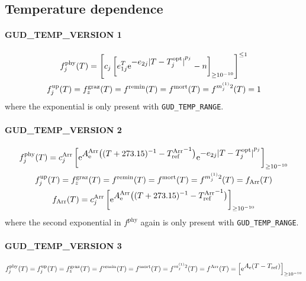 \documentclass[11pt,letterpaper,english]{article}
\let\ds=\displaystyle
\def\|#1|{\operatorname{#1}}
\def\mort{m^{(1)}_j}
\newcommand{\ee}{\mathrm{e}}
\newcommand{\graz}{{\text{graz}}}
\newcommand{\phy}{{\text{phy}}}
\newcommand{\up}{{\text{up}}}
\newcommand{\remin}{{\text{remin}}}
\begin{document}
\subsection{Temperature dependence}

\paragraph{GUD\_TEMP\_VERSION 1}
\begin{gather*}
  f^\phy_j(T) = \left[ c_j \left[ e_{1 j}^T
      \ee^{\ds -e_{2 j} {| T - T^{\|opt|}_j |}^{p_j}}  %
    - n \right]_{\ge\num{E-10}}
    \right]^{\le 1}
\\
  f^{\up}_j(T) =
  f^\graz_z(T) =
  f^\remin(T) =
  f^{\|mort|}(T) =
  f^{\mort2}(T) =
  1
\end{gather*}
where the exponential is only present with \verb|GUD_TEMP_RANGE|.

\paragraph{GUD\_TEMP\_VERSION 2}
\begin{gather*}
  f^\phy_j(T) = c^{\|Arr|}_j \left[
      \ee^{\ds A^{\|Arr|}_{\|e|}
           \bigl( (T+273.15)^{-1} - {T^{\|Arr|}_{\|ref|}}^{-1} \bigr)}
      \ee^{\ds -e_{2 j} {| T - T^{\|opt|}_j |}^{p_j}}  %
    \right]_{\ge\num{E-10}}
\\
  f^{\up}_j(T) =
  f^\graz_z(T) =
  f^\remin(T) =
  f^{\|mort|}(T) =
  f^{\mort2}(T) =
  f_{\|Arr|}(T)
\\
  f_{\|Arr|}(T) = c^{\|Arr|}_j \left[
      \ee^{\ds A^{\|Arr|}_{\|e|}
           \bigl( (T+273.15)^{-1} - {T^{\|Arr|}_{\|ref|}}^{-1} \bigr)}
    \right]_{\ge\num{E-10}}
\end{gather*}
where the second exponential in $f^\phy$ again is only present with \verb|GUD_TEMP_RANGE|.

\paragraph{GUD\_TEMP\_VERSION 3}
\begin{gather*}
  f^\phy_j(T) =
  f^{\up}_j(T) =
  f^\graz_z(T) =
  f^\remin(T) =
  f^{\|mort|}(T) =
  f^{\mort2}(T) =
  f^{\|Arr|}(T) =
  \left[ \ee^{\ds A_{\|e|} (T - T_{\|ref|})} \right]_{\ge\num{E-10}}
\end{gather*}
\end{document}
